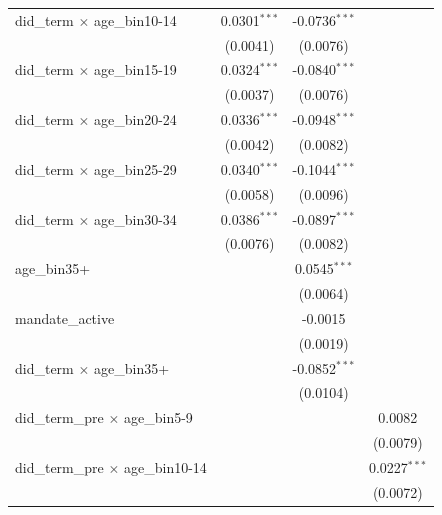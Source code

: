 \begin{tabular}{lccc}
   did\_term $\times$ age\_bin10-14          & 0.0301$^{***}$  & -0.0736$^{***}$ &   \\   
                                             & (0.0041)        & (0.0076)        &   \\   
   did\_term $\times$ age\_bin15-19          & 0.0324$^{***}$  & -0.0840$^{***}$ &   \\   
                                             & (0.0037)        & (0.0076)        &   \\   
   did\_term $\times$ age\_bin20-24          & 0.0336$^{***}$  & -0.0948$^{***}$ &   \\   
                                             & (0.0042)        & (0.0082)        &   \\   
   did\_term $\times$ age\_bin25-29          & 0.0340$^{***}$  & -0.1044$^{***}$ &   \\   
                                             & (0.0058)        & (0.0096)        &   \\   
   did\_term $\times$ age\_bin30-34          & 0.0386$^{***}$  & -0.0897$^{***}$ &   \\   
                                             & (0.0076)        & (0.0082)        &   \\   
   age\_bin35+                               &                 & 0.0545$^{***}$  &   \\   
                                             &                 & (0.0064)        &   \\   
   mandate\_active                           &                 & -0.0015         &   \\   
                                             &                 & (0.0019)        &   \\   
   did\_term $\times$ age\_bin35+            &                 & -0.0852$^{***}$ &   \\   
                                             &                 & (0.0104)        &   \\   
   did\_term\_pre $\times$ age\_bin5-9       &                 &                 & 0.0082\\   
                                             &                 &                 & (0.0079)\\   
   did\_term\_pre $\times$ age\_bin10-14     &                 &                 & 0.0227$^{***}$\\   
                                             &                 &                 & (0.0072)\\   

\end{tabular}
